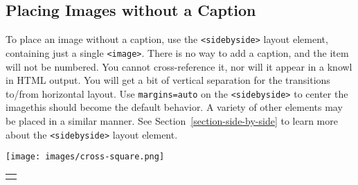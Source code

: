 \documentclass[10pt,]{article}
\theoremstyle{plain}
\theoremstyle{definition}
\theoremstyle{definition}
\theoremstyle{definition}
\theoremstyle{definition}
\theoremstyle{definition}
\theoremstyle{definition}
\numberwithin{equation}{section}
\newlength{\panelmax}
\begin{document}
\subsection[{Placing Images without a Caption}]{Placing Images without a Caption}\label{subsection-20}
\hypertarget{p-258}{}%
To place an image without a caption, use the \lstinline?<sidebyside>? layout element, containing just a single \lstinline?<image>?.  There is no way to add a caption, and the item will not be numbered.  You cannot cross-reference it, nor will it appear in a knowl in HTML output.  You will get a bit of vertical separation for the transitions to/from horizontal layout.  Use \lstinline?margins=auto? on the \lstinline?<sidebyside>? to center the image\textemdash{}this should become the default behavior.  A variety of other elements may be placed in a similar manner.  See Section~\hyperref[section-side-by-side]{\ref{section-side-by-side}} to learn more about the \lstinline?<sidebyside>? layout element.%
{%
\setlength{\panelmax}{0pt}
\ifdefined\panelboxAimage\else\newsavebox{\panelboxAimage}\fi%
\begin{lrbox}{\panelboxAimage}
\texttt{[image: images/cross-square.png]}
\end{lrbox}
\ifdefined\phAimage\else\newlength{\phAimage}\fi%
\setlength{\phAimage}{\ht\panelboxAimage+\dp\panelboxAimage}
\settototalheight{\phAimage}{\usebox{\panelboxAimage}}
\setlength{\panelmax}{\maxof{\panelmax}{\phAimage}}
\leavevmode%
\setlength{\tabcolsep}{0\linewidth}
\par\medskip\noindent
\hspace*{0.35\linewidth}%
\begin{tabular}{@{}*{1}{c}@{}}
\begin{minipage}[c][\panelmax][t]{0.3\linewidth}\usebox{\panelboxAimage}\end{minipage}\end{tabular}\\
}%
\typeout{************************************************}
\typeout{************************************************}
\end{document}
